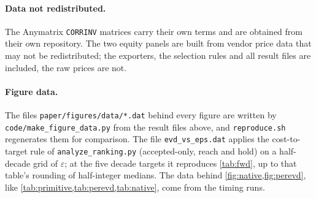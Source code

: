 \paragraph{Data not redistributed.}
The Anymatrix \texttt{CORRINV} matrices carry their own terms and are obtained
from their own repository. The two equity panels are built from vendor price
data that may not be redistributed; the exporters, the selection rules and all
result files are included, the raw prices are not.

{\sloppy
\paragraph{Figure data.} The files \texttt{paper/figures/data/*.dat} behind
every figure are written by \texttt{code/make\_figure\_data.py} from the result
files above, and \texttt{reproduce.sh} regenerates them for comparison. The
file \texttt{evd\_vs\_eps.dat} applies the cost-to-target rule of
\texttt{analyze\_ranking.py} (accepted-only, reach and hold) on a half-decade
grid of $\varepsilon$; at the five decade targets it reproduces \cref{tab:fwd},
up to that table's rounding of half-integer medians. The data behind
\cref{fig:native,fig:perevd}, like \cref{tab:primitive,tab:perevd,tab:native},
come from the timing runs.\par}
